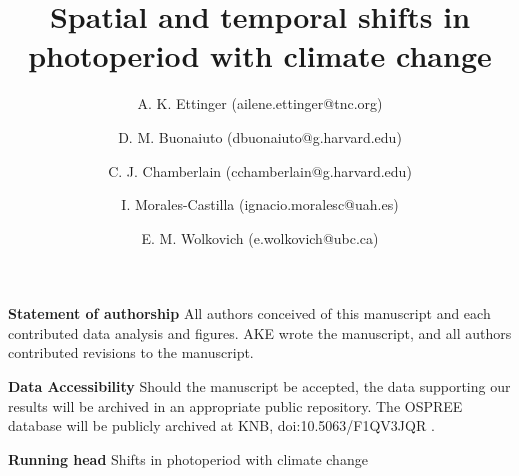 \documentclass{article}
\begin{document}



\title{Spatial and temporal shifts in photoperiod with climate change} %


\author[1,2,a]{A. K. Ettinger (ailene.ettinger@tnc.org)}
\author[2,3]{D. M. Buonaiuto (dbuonaiuto@g.harvard.edu)}

\author[2,3]{C. J. Chamberlain (cchamberlain@g.harvard.edu)}

\author[2,3,4,5]{I. Morales-Castilla (ignacio.moralesc@uah.es)}

\author[2,3,6]{E. M. Wolkovich (e.wolkovich@ubc.ca)}






 



\maketitle %
\textbf{Statement of authorship} 
All authors conceived of this manuscript and each contributed data analysis and figures. AKE wrote the manuscript, and all authors contributed revisions to the manuscript. 

\textbf{Data Accessibility} Should the manuscript be accepted, the data supporting our results will be archived in an appropriate public repository. The OSPREE database will be publicly archived at KNB, doi:10.5063/F1QV3JQR \citep{wolkovich2019}.

\textbf{Running head} Shifts in photoperiod with climate change
\end{document}

